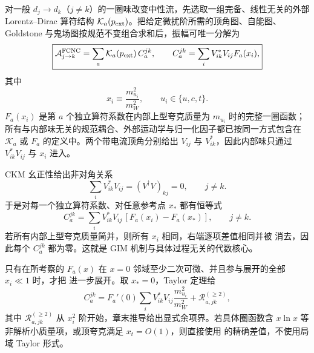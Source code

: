 \begin{proposition}
对一般 $d_j\to d_k$（$j\ne k$）的一圈味改变中性流，先选取一组完备、线性无关的外部 Lorentz--Dirac 算符结构 $\mathcal K_a(p_{\rm ext})$。把给定微扰阶所需的顶角图、自能图、Goldstone 与鬼场图按规范不变组合求和后，振幅可唯一分解为
\begin{equation}
 \boxed{
 \mathcal A_{j\to k}^{\rm FCNC}
 =\sum_a \mathcal K_a(p_{\rm ext})\,C_a^{jk},
 \qquad
 C_a^{jk}
 =\sum_iV_{ik}^*V_{ij}F_a(x_i),}
 \label{eq:sm-gim-loop-sum-dp83}
\end{equation}
其中
\begin{equation*}
 x_i\equiv\frac{m_{u_i}^2}{m_W^2},
 \qquad u_i\in\{u,c,t\}.
\end{equation*}
$F_a(x_i)$ 是第 $a$ 个独立算符系数在内部上型夸克质量为 $m_{u_i}$ 时的完整一圈函数；所有与内部味无关的规范耦合、外部运动学与归一化因子都已按同一方式包含在 $\mathcal K_a$ 或 $F_a$ 的定义中。两个带电流顶角分别给出 $V_{ij}$ 与 $V_{ik}^*$，因此内部味只通过 $V_{ik}^*V_{ij}$ 与 $x_i$ 进入。

CKM 幺正性给出非对角关系
\begin{equation}
 \boxed{
 \sum_iV_{ik}^*V_{ij}=(V^\dagger V)_{kj}=0,
 \qquad j\ne k.}
 \label{eq:sm-gim-unitarity-dp83}
\end{equation}
于是对每一个独立算符系数、对任意参考点 $x_*$ 都有恒等式
\begin{equation}
 \boxed{
 C_a^{jk}
 =\sum_iV_{ik}^*V_{ij}\,[F_a(x_i)-F_a(x_*)],
 \qquad j\ne k.}
 \label{eq:sm-gim-subtracted-exact-dp85}
\end{equation}
若所有内部上型夸克质量简并，则所有 $x_i$ 相同，右端逐项差值相同并被 消去，因此每个 $C_a^{jk}$ 都为零。这就是 GIM 机制与具体过程无关的代数核心。

只有在所考察的 $F_a(x)$ 在 $x=0$ 邻域至少二次可微、并且参与展开的全部 $x_i\ll1$ 时，才把 进一步展开。取 $x_*=0$，Taylor 定理给
\begin{equation}
 \boxed{
 C_a^{jk}
 =F_a'(0)
 \sum_iV_{ik}^*V_{ij}\frac{m_{u_i}^2}{m_W^2}
 +\mathcal R_{a,jk}^{(\ge2)},}
 \label{eq:sm-gim-mass-suppression-dp83}
\end{equation}
其中 $\mathcal R_{a,jk}^{(\ge2)}$ 从 $x_i^2$ 阶开始，章末推导给出显式余项界。若具体圈函数含 $x\ln x$ 等非解析小质量项，或顶夸克满足 $x_t=O(1)$，则直接使用 的精确差值，不使用局域 Taylor 形式。
\end{proposition}


